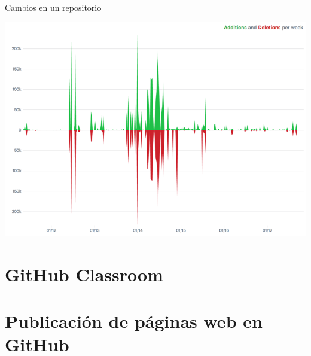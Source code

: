 \documentclass[xcolor={usenames,svgnames,dvipsnames}]{beamer}
\begin{document}
\begin{frame}[label={sec:orga8ec7e6}]{Cambios en un repositorio}
\begin{center}
\includegraphics[width=.9\linewidth]{figs/repo_code_frequency_graph_dotcom.png}
\end{center}
\end{frame}

\section{GitHub Classroom}
\label{sec:org699be20}
\section{Publicación de páginas web en GitHub}
\label{sec:org379e77c}
\end{document}
